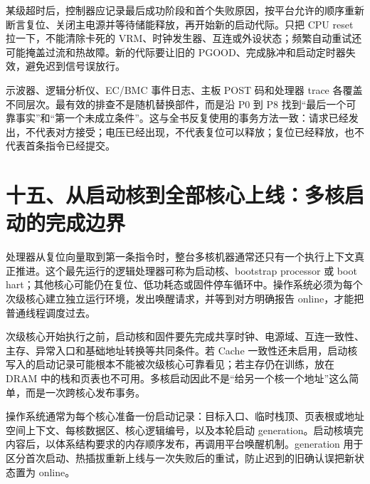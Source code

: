 某级超时后，控制器应记录最后成功阶段和首个失败原因，按平台允许的顺序重新断言复位、关闭主电源并等待储能释放，再开始新的启动代际。只把 CPU reset 拉一下，不能清除卡死的 VRM、时钟发生器、互连或外设状态；频繁自动重试还可能掩盖过流和热故障。新的代际要让旧的 PGOOD、完成脉冲和启动定时器失效，避免迟到信号误放行。

示波器、逻辑分析仪、EC/BMC 事件日志、主板 POST 码和处理器 trace 各覆盖不同层次。最有效的排查不是随机替换部件，而是沿 P0 到 P8 找到“最后一个可靠事实”和“第一个未成立条件”。这与全书反复使用的事务方法一致：请求已经发出，不代表对方接受；电压已经出现，不代表复位可以释放；复位已经释放，也不代表首条指令已经提交。
\section{十五、从启动核到全部核心上线：多核启动的完成边界}

处理器从复位向量取到第一条指令时，整台多核机器通常还只有一个执行上下文真正推进。这个最先运行的逻辑处理器可称为启动核、bootstrap processor 或 boot hart；其他核心可能仍在复位、低功耗态或固件停车循环中。操作系统必须为每个次级核心建立独立运行环境，发出唤醒请求，并等到对方明确报告 online，才能把普通线程调度过去。


次级核心开始执行之前，启动核和固件要先完成共享时钟、电源域、互连一致性、主存、异常入口和基础地址转换等共同条件。若 Cache 一致性还未启用，启动核写入的启动记录可能根本不能被次级核心可靠看见；若主存仍在训练，放在 DRAM 中的栈和页表也不可用。多核启动因此不是“给另一个核一个地址”这么简单，而是一次跨核心发布事务。

操作系统通常为每个核心准备一份启动记录：目标入口、临时栈顶、页表根或地址空间上下文、每核数据区、核心逻辑编号，以及本轮启动 generation。启动核填完内容后，以体系结构要求的内存顺序发布，再调用平台唤醒机制。generation 用于区分首次启动、热插拔重新上线与一次失败后的重试，防止迟到的旧确认误把新状态置为 online。

